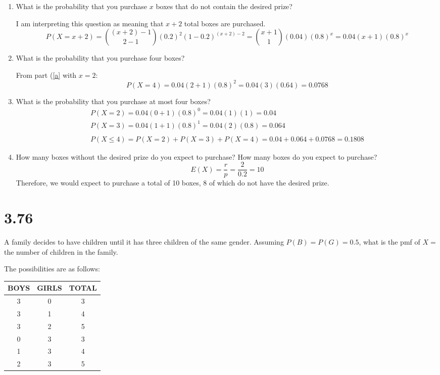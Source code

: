 \documentclass[letterpaper,12pt,fleqn]{article}
\begin{document}
\begin{enumerate}[label={\alph*)}]
\item\label{a} What is the probability that you purchase \(x\) boxes that do not contain the desired prize?

  I am interpreting this question as meaning that \(x+2\) total boxes are purchased.
  \[P(X=x+2)=\binom{(x+2)-1}{2-1}(0.2)^2(1-0.2)^{(x+2)-2}=\binom{x+1}{1}(0.04)(0.8)^x=0.04(x+1)(0.8)^x\]
\item What is the probability that you purchase four boxes?

  From part (\ref{a} with \(x=2\):
  \[P(X=4)=0.04(2+1)(0.8)^2=0.04(3)(0.64)=0.0768\]
\item What is the probability that you purchase at most four boxes?
  \begin{gather*}
    P(X=2)=0.04(0+1)(0.8)^0=0.04(1)(1)=0.04 \\
    P(X=3)=0.04(1+1)(0.8)^1=0.04(2)(0.8)=0.064 \\
    \\
    P(X\le4)=P(X=2)+P(X=3)+P(X=4)=0.04+0.064+0.0768=0.1808
  \end{gather*}
\item How many boxes without the desired prize do you expect to purchase?  How many boxes do you expect to purchase?
  \[E(X)=\frac{r}{p}=\frac{2}{0.2}=10\]
  Therefore, we would expect to purchase a total of 10 boxes, 8 of which do not have the desired prize.
\end{enumerate}

\section*{3.76}
A family decides to have children until it has three children of the same gender.  Assuming \(P(B)=P(G)=0.5\), what is the
pmf of \(X=\) the number of children in the family.

The possibilities are as follows:

\begin{tabular}{|c|c|c|}
  \hline
  BOYS & GIRLS & TOTAL \\
  \hline
  3 & 0 & 3 \\
  \hline
  3 & 1 & 4 \\
  \hline
  3 & 2 & 5 \\
  \hline
  0 & 3 & 3 \\
  \hline
  1 & 3 & 4 \\
  \hline
  2 & 3 & 5 \\
  \hline
\end{tabular}
\end{document}
